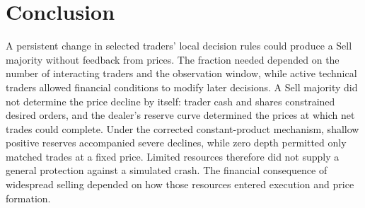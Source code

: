 \section{Conclusion}

A persistent change in selected traders' local decision rules could
produce a Sell majority without feedback from prices. The fraction
needed depended on the number of interacting traders and the observation
window, while active technical traders allowed financial conditions to
modify later decisions. A Sell majority did not determine the price
decline by itself: trader cash and shares constrained desired orders,
and the dealer's reserve curve determined the prices at which net
trades could complete. Under the corrected constant-product mechanism,
shallow positive reserves accompanied severe declines, while zero
depth permitted only matched trades at a fixed price. Limited resources
therefore did not supply a general protection against a simulated crash.
The financial consequence of widespread selling depended on how those
resources entered execution and price formation.
